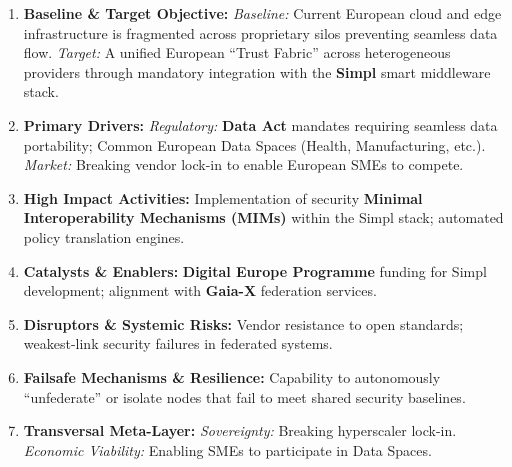 \documentclass[12pt,a4paper]{report}
\begin{document}
\begin{enumerate}
\item \textbf{Baseline \& Target Objective:}
\textit{Baseline:} Current European cloud and edge infrastructure is fragmented across proprietary silos preventing seamless data flow.
\textit{Target:} A unified European ``Trust Fabric'' across heterogeneous providers through mandatory integration with the \textbf{Simpl} smart middleware stack.

\item \textbf{Primary Drivers:} 
\textit{Regulatory:} \textbf{Data Act} mandates requiring seamless data portability; Common European Data Spaces (Health, Manufacturing, etc.).
\textit{Market:} Breaking vendor lock-in to enable European SMEs to compete.

\item \textbf{High Impact Activities:} 
Implementation of security \textbf{Minimal Interoperability Mechanisms (MIMs)} within the Simpl stack; automated policy translation engines.

\item \textbf{Catalysts \& Enablers:} 
\textbf{Digital Europe Programme} funding for Simpl development; alignment with \textbf{Gaia-X} federation services.

\item \textbf{Disruptors \& Systemic Risks:} 
Vendor resistance to open standards; weakest-link security failures in federated systems.

\item \textbf{Failsafe Mechanisms \& Resilience:} 
Capability to autonomously ``unfederate'' or isolate nodes that fail to meet shared security baselines.

\item \textbf{Transversal Meta-Layer:} 
\textit{Sovereignty:} Breaking hyperscaler lock-in. \textit{Economic Viability:} Enabling SMEs to participate in Data Spaces.
\end{enumerate}
\end{document}
